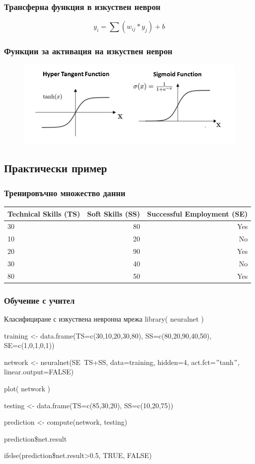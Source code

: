 \documentclass{beamer}
\begin{document}
\begin{frame}
\frametitle{Трансферна функция в изкуствен неврон}
\begin{equation}
y_i = \sum{(w_{ij}*y_j)} + b
\end{equation}
\end{frame}

\begin{frame}
\frametitle{Функции за активация на изкуствен неврон}
\begin{figure}[]\includegraphics[width=\textwidth,height=0.75\textheight]{pic0064}\end{figure}
\end{frame}

\subsection{Практически пример}

\begin{frame}
\frametitle{Тренировъчно множество данни}
\begin{table}[ht]
\centering
\begin{tabular}{|l|r|r|} 
	\hline
	Technical Skills (TS) & Soft Skills (SS) & Successful Employment (SE) \\
	\hline\hline
	30 & 80 & Yes \\
	\hline
	10 & 20 & No \\
	\hline
	20 & 90 & Yes \\
	\hline
	30 & 40 & No \\
	\hline
	80 & 50 & Yes \\
	\hline
\end{tabular}
\end{table}
\end{frame}

\begin{frame}
\frametitle{Обучение с учител}
\begin{block}{Класифициране с изкуствена невронна мрежа}
library( neuralnet )

training <- data.frame(TS=c(30,10,20,30,80), SS=c(80,20,90,40,50), SE=c(1,0,1,0,1))

network <- neuralnet(SE~TS+SS, data=training, hidden=4, act.fct=$"$tanh$"$, linear.output=FALSE)

plot( network )

testing <- data.frame(TS=c(85,30,20), SS=c(10,20,75))

prediction <- compute(network, testing)

prediction\$net.result

ifelse(prediction\$net.result>0.5, TRUE, FALSE)
\end{block}
\end{frame}
\end{document}
